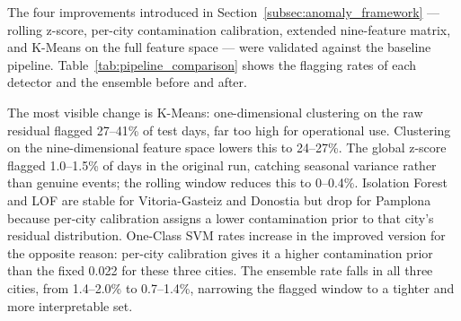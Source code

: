 ﻿\documentclass[12pt,reqno, twoside]{amsbook}
\numberwithin{figure}{chapter}
\numberwithin{table}{chapter}
\numberwithin{equation}{chapter}
\theoremstyle{plain}
\numberwithin{equation}{chapter}
\numberwithin{section}{chapter}
\begin{document}
The four improvements introduced in Section~\ref{subsec:anomaly_framework} --- rolling z-score, per-city contamination calibration, extended nine-feature matrix, and K-Means on the full feature space --- were validated against the baseline pipeline. Table~\ref{tab:pipeline_comparison} shows the flagging rates of each detector and the ensemble before and after.

The most visible change is K-Means: one-dimensional clustering on the raw residual flagged 27--41\% of test days, far too high for operational use. Clustering on the nine-dimensional feature space lowers this to 24--27\%. The global z-score flagged 1.0--1.5\% of days in the original run, catching seasonal variance rather than genuine events; the rolling window reduces this to 0--0.4\%. Isolation Forest and \ac{LOF} are stable for Vitoria-Gasteiz and Donostia but drop for Pamplona because per-city calibration assigns a lower contamination prior to that city's residual distribution. One-Class \ac{SVM} rates increase in the improved version for the opposite reason: per-city calibration gives it a higher contamination prior than the fixed 0.022 for these three cities. The ensemble rate falls in all three cities, from 1.4--2.0\% to 0.7--1.4\%, narrowing the flagged window to a tighter and more interpretable set.
\end{document}
